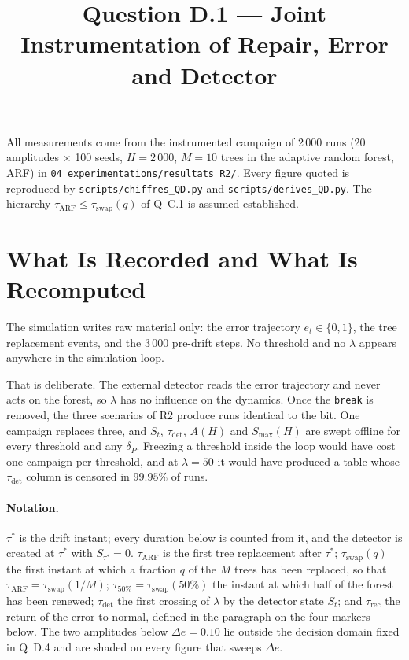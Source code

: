 \documentclass[11pt,a4paper]{article}
\title{Question D.1 --- Joint Instrumentation of Repair, Error and Detector}
\author{}
\date{}
\begin{document}
\maketitle

\noindent All measurements come from the instrumented campaign of 2\,000 runs
(20 amplitudes $\times$ 100 seeds, $H=2\,000$, $M=10$ trees in the adaptive random
forest, ARF) in \texttt{04\_experimentations/resultats\_R2/}. Every figure quoted is
reproduced by \texttt{scripts/chiffres\_QD.py} and \texttt{scripts/derives\_QD.py}. The
hierarchy $\tau_{\mathrm{ARF}} \le \tau_{\mathrm{swap}}(q)$ of Q~C.1 is assumed
established.

\section{What Is Recorded and What Is Recomputed}

The simulation writes raw material only: the error trajectory $e_t \in \{0,1\}$, the tree
replacement events, and the $3\,000$ pre-drift steps. No threshold and no $\lambda$ appears
anywhere in the simulation loop.

That is deliberate. The external detector reads the error trajectory and never acts on the
forest, so $\lambda$ has no influence on the dynamics. Once the \texttt{break} is removed,
the three scenarios of R2 produce runs identical to the bit. One campaign replaces three,
and $S_t$, $\tau_{\mathrm{det}}$, $A(H)$ and $S_{\max}(H)$ are swept offline for every
threshold and any $\delta_P$. Freezing a threshold inside the loop would have cost one
campaign per threshold, and at $\lambda = 50$ it would have produced a table whose
$\tau_{\mathrm{det}}$ column is censored in $99.95\%$ of runs.

\paragraph{Notation.} $\tau^*$ is the drift instant; every duration below is counted from
it, and the detector is created at $\tau^*$ with $S_{\tau^*} = 0$. $\tau_{\mathrm{ARF}}$ is
the first tree replacement after $\tau^*$; $\tau_{\mathrm{swap}}(q)$ the first instant at
which a fraction $q$ of the $M$ trees has been replaced, so that
$\tau_{\mathrm{ARF}} = \tau_{\mathrm{swap}}(1/M)$; $\tau_{50\%} = \tau_{\mathrm{swap}}(50\%)$
the instant at which half of the forest has been renewed; $\tau_{\mathrm{det}}$ the first
crossing of $\lambda$ by the detector state $S_t$; and $\tau_{\mathrm{rec}}$ the return of
the error to normal, defined in the paragraph on the four markers below. The two amplitudes
below $\Delta e = 0.10$ lie outside the decision domain fixed in Q~D.4 and are shaded on
every figure that sweeps $\Delta e$.
\end{document}
